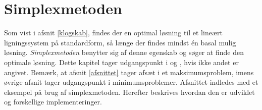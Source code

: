 \chapter{Simplexmetoden}
\label{coronaaaaaaaaaaa}
%
Som vist i afsnit \ref{klogskab}, findes der en optimal løsning til et lineært ligningssystem på standardform, så længe der findes mindst én basal mulig løsning. 
\textit{Simplexmetoden} benytter sig af denne egenskab og søger at finde den optimale løsning.
Dette kapitel tager udgangspunkt i \citep[side 25-34]{lay} og \citep[side 82-87 og 94-100]{bert}, hvis ikke andet er angivet.
Bemærk, at afsnit \ref{afsnittet} tager afsæt i et maksimumsproblem, imens øvrige afsnit tager udgangspunkt i minimumsproblemer.
Afsnittet indledes med et eksempel på brug af simplexmetoden.
Herefter beskrives hvordan den er udviklet og forskellige implementeringer.
	
%	
%
	
%
%
	
%	
%
	
%
%
	
%
%
	
%
%



